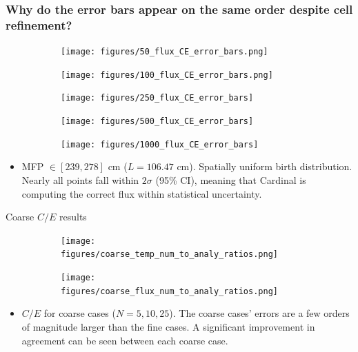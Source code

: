 \documentclass[9pt,t,aspectratio=169]{beamer}
\begin{document}
\begin{frame}
    \frametitle{Why do the error bars appear on the same order despite cell refinement?}
        \vspace*{-0.425cm}
        \begin{figure}[T]
            \centering
            \begin{subfigure}{0.3\textwidth}
                \texttt{[image: figures/50\_flux\_CE\_error\_bars.png]}
            \end{subfigure}
            \begin{subfigure}{0.3\textwidth}
                \texttt{[image: figures/100\_flux\_CE\_error\_bars.png]}
            \end{subfigure}
            \begin{subfigure}{0.3\textwidth}
                \texttt{[image: figures/250\_flux\_CE\_error\_bars]}
            \end{subfigure}
            \begin{subfigure}{0.3\textwidth}
                \texttt{[image: figures/500\_flux\_CE\_error\_bars]}
            \end{subfigure}
            \begin{subfigure}{0.3\textwidth}
                \texttt{[image: figures/1000\_flux\_CE\_error\_bars]}
            \end{subfigure}
        \end{figure}
        \vspace*{-0.1cm}
        \begin{itemize}
            \item <2->MFP $\in[239,278]$ cm ($L=106.47$ cm). Spatially uniform birth distribution. Nearly all points fall within $2\sigma$ (95\% CI), meaning that Cardinal is computing the correct flux within statistical uncertainty.
        \end{itemize}
\end{frame}


\begin{frame}{Coarse $C/E$ results}
    \vspace*{-0.3cm}
    \begin{figure}[T]
        \begin{subfigure}{0.475\linewidth}
            \texttt{[image: figures/coarse\_temp\_num\_to\_analy\_ratios.png]}
        \end{subfigure}\hspace{0.3cm}
        \begin{subfigure}{0.475\linewidth}
            \texttt{[image: figures/coarse\_flux\_num\_to\_analy\_ratios.png]}
        \end{subfigure}
    \end{figure}
    \begin{itemize}
        \item $C/E$ for coarse cases ($N=5,10,25$). The coarse cases' errors are a few orders of magnitude larger than the fine cases. A significant improvement in agreement can be seen between each coarse case.
    \end{itemize}
\end{frame}
\end{document}

